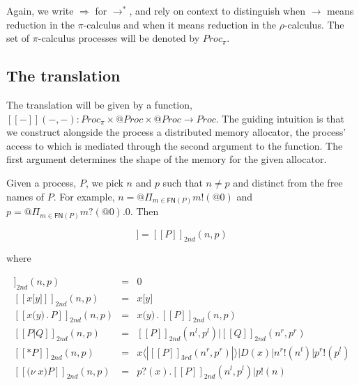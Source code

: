 \documentclass{llncs}
\makeatletter
\newcommand{\pic}{$\pi$-calculus}
\newcommand{\ldb}{[\![}
\newcommand{\rdb}{]\!]}
\newcommand{\lliftb}{\langle\!|}
\newcommand{\rliftb}{|\!\rangle}
\newcommand{\id}[1]{\texttt{#1}}
\newcommand{\pzero}{\mathbin{0}}
\newcommand{\juxtap}{\mathbin{\id{|}}}
\newcommand{\concat}{\mathbin{.}}
\newcommand{\freenames}[1]{\mathbin{\mathsf{FN}(#1)}}
\newcommand{\binpar}[2]{#1 | #2}
\newcommand{\outputp}[2]{#1!(#2)}
\newcommand{\prefix}[3]{#1?(#2) . #3}
\newcommand{\lift}[2]{#1 \lliftb #2 \rliftb}
\newcommand{\quotep}[1]{\mathsf{@}#1}
\newcommand{\meaningof}[1]{\ldb #1 \rdb}
\newcommand{\Proc}{\mathbin{Proc}}
\newcommand{\QProc}{\quotep{\mathbin{Proc}}}
\newcommand{\red}{\rightarrow}
\newcommand{\wred}{\Rightarrow}
\newcommand{\rhoc}{$\rho$-calculus}
\makeatother
\begin{document}
Again, we write $\wred$ for $\red^*$, and rely on context to
distinguish when $\red$ means reduction in the {\pic} and when it
means reduction in the {\rhoc}. The set of {\pic} processes will be
denoted by $\Proc_{\pi}$.

\subsection{The translation}

The translation will be given by a function, $\meaningof{-}( -, - ) :
\Proc_{\pi} \times \QProc \times \QProc \red \Proc$. The guiding
intuition is that we construct alongside the process a distributed memory
allocator, the process' access to which is mediated through the second argument
to the function. The first argument determines the shape of the memory
for the given allocator.

Given a process, $P$, we pick $n$ and $p$ such that $n \neq p$ and
distinct from the free names of $P$. For example, $n = \quotep{\Pi_{m
\in \freenames{P}}\outputp{m}{\quotep{\pzero}}}$ and $p =
\quotep{\Pi_{m \in
\freenames{P}}\prefix{m}{\quotep{\pzero}}{\pzero}}$. Then

\begin{equation*}
	\meaningof{P} = \meaningof{P}_{2nd}( n, p )
\end{equation*}

where

\begin{eqnarray*}
   	\meaningof{\pzero}_{2nd} (  n, p )
   		& = &
   		 \pzero \\
   	\meaningof{x \id{[} y \id{]}}_{2nd} (  n, p ) 
  		& = & 
  		x \id{[} y \id{]} \\
   	\meaningof{x \id{(} y \id{)} \concat P}_{2nd} (  n, p ) 
   		& = & 
 		x \id{(} y \id{)} \concat \meaningof{P}_{2nd} (  n, p ) \\
   	\meaningof{P \juxtap Q}_{2nd} (  n, p ) 
   		& = & 
 		\meaningof{P}_{2nd} ( n^{l}, p^{l} )
   			 \juxtap \meaningof{Q}_{2nd} ( n^{r}, p^{r} ) \\
   	\meaningof{\mathsf{*} P}_{2nd} (  n, p )
   		& = & \binpar{\lift{x}{\meaningof{P}_{3rd}( n^{r}, p^{r} )}}
		             {\binpar{D(x)}{\binpar{\outputp{n^{r}}{n^{l}}}{\outputp{p^{r}}{p^{l}}}}} \\
   	\meaningof{\id{(}\nu \; x \id{)} P}_{2nd} (  n, p ) 
   		& = & 
 		\prefix{p}{x}{\binpar{\meaningof{P}_{2nd} ( n^{l}, p^{l} )}{\outputp{p}{n}}} \\
\end{eqnarray*}
\end{document}
